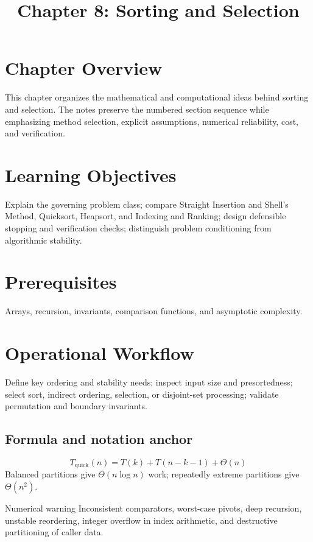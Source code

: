 \documentclass[10pt,letterpaper]{article}
\title{Chapter 8: Sorting and Selection}
\author{}
\date{}
\begin{document}
\maketitle

\section*{Chapter Overview}
This chapter organizes the mathematical and computational ideas behind sorting and selection. The notes preserve the numbered section sequence while emphasizing method selection, explicit assumptions, numerical reliability, cost, and verification.

\section*{Learning Objectives}
Explain the governing problem class; compare Straight Insertion and Shell's Method, Quicksort, Heapsort, and Indexing and Ranking; design defensible stopping and verification checks; distinguish problem conditioning from algorithmic stability.

\section*{Prerequisites}
Arrays, recursion, invariants, comparison functions, and asymptotic complexity.

\section*{Operational Workflow}
Define key ordering and stability needs; inspect input size and presortedness; select sort, indirect ordering, selection, or disjoint-set processing; validate permutation and boundary invariants.

\subsection*{Formula and notation anchor}
\[
T_{\mathrm{quick}}(n)=T(k)+T(n-k-1)+\Theta(n)
\]
Balanced partitions give $\Theta(n\log n)$ work; repeatedly extreme partitions give $\Theta(n^2)$.

\begin{warnbox}{Numerical warning}
Inconsistent comparators, worst-case pivots, deep recursion, unstable reordering, integer overflow in index arithmetic, and destructive partitioning of caller data.
\end{warnbox}
\end{document}
